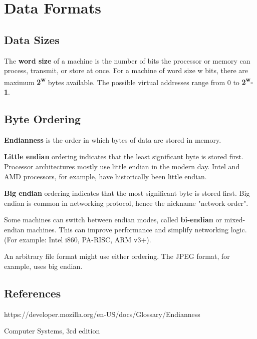 \chapter{Data Formats}

\section{Data Sizes}
The \textbf{word size} of a machine is the number of bits the processor or memory can process, transmit, or store at once. For a machine of word size w bits, there are maximum \textbf{2\textsuperscript{w}} bytes available. The possible virtual addresses range from 0 to \textbf{2\textsuperscript{w}-1}.


\section{Byte Ordering}

\textbf{Endianness} is the order in which bytes of data are stored in memory.

\textbf{Little endian} ordering indicates that the least significant byte is stored first. Processor architectures mostly use little endian in the modern day. Intel and AMD processors, for example, have historically been little endian.

\textbf{Big endian} ordering indicates that the most significant byte is stored first. Big endian is common in networking protocol, hence the nickname "network order".

Some machines can switch between endian modes, called \textbf{bi-endian} or {mixed-endian} machines. This can improve performance and simplify networking logic. (For example: Intel i860, PA-RISC, ARM v3+).

An arbitrary file format might use either ordering. The JPEG format, for example, uses big endian.

\section{References}

https://developer.mozilla.org/en-US/docs/Glossary/Endianness

Computer Systems, 3rd edition